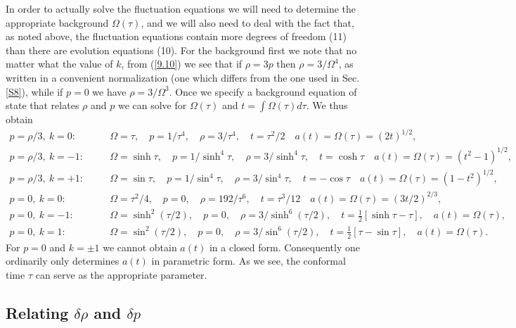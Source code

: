 \documentclass[aps,onecolumn,10pt]{revtex4}
\numberwithin{equation}{section}
\numberwithin{equation}{section}
\begin{document}
In order to actually solve the fluctuation equations we will need to determine the appropriate background $\Omega(\tau)$, and we will also need to deal with the fact that, as noted above,  the fluctuation equations contain more degrees of freedom (11) than there are evolution equations (10). For the background first we note that no matter what the value of $k$, from (\ref{9.10}) we see that if $\rho=3p$ then $\rho=3/\Omega^4$,  as written in a convenient normalization (one which differs from the one used in Sec. \ref{S8}), while if $p=0$ we have $\rho=3/\Omega^3$. Once we specify a background equation of state that relates $\rho$ and $p$ we can solve for $\Omega (\tau)$ and $t=\int \Omega(\tau)d\tau$. We thus obtain 
%
\begin{eqnarray}
p=\rho/3,~k=0:&&\quad \Omega=\tau,\quad p=1/\tau^4,\quad \rho=3/\tau^4,\quad t=\tau^2/2\quad a(t)=\Omega(\tau)=(2t)^{1/2},
\nonumber\\
p=\rho/3,~k=-1:&&\quad \Omega=\sinh\tau,\quad p=1/\sinh^4\tau,\quad \rho=3/\sinh^4\tau,\quad t=\cosh\tau\quad a(t)=\Omega(\tau)=(t^2-1)^{1/2},
\nonumber\\
p=\rho/3,~k=+1:&&\quad \Omega=\sin\tau,\quad p=1/\sin^4\tau,\quad \rho=3/\sin^4\tau,\quad t=-\cos\tau\quad a(t)=\Omega(\tau)=(1-t^2)^{1/2},
\nonumber\\
p=0,~k=0:&&\quad \Omega=\tau^2/4,\quad p=0,\quad \rho=192/\tau^6,\quad t=\tau^{3}/12\quad a(t)=\Omega(\tau)=(3t/2)^{2/3},
\nonumber\\
p=0,~k=-1:&&\quad \Omega=\sinh^2(\tau/2),\quad p=0,\quad \rho=3/\sinh^6(\tau/2),\quad t=\tfrac{1}{2}[\sinh\tau-\tau],\quad a(t)=\Omega(\tau),
\nonumber\\
p=0,~k=1:&&\quad \Omega=\sin^2(\tau/2),\quad p=0,\quad \rho=3/\sin^6(\tau/2),\quad t=\tfrac{1}{2}[\tau-\sin\tau],\quad a(t)=\Omega(\tau).
\label{9.49}
\end{eqnarray}
%
For $p=0$ and $k=\pm 1$ we cannot obtain $a(t)$ in a closed form. Consequently one ordinarily only determines $a(t)$ in parametric form. As we see, the conformal time $\tau$ can serve as the appropriate parameter.

\subsection{Relating $\delta\rho$ and $\delta p$}
\end{document}
